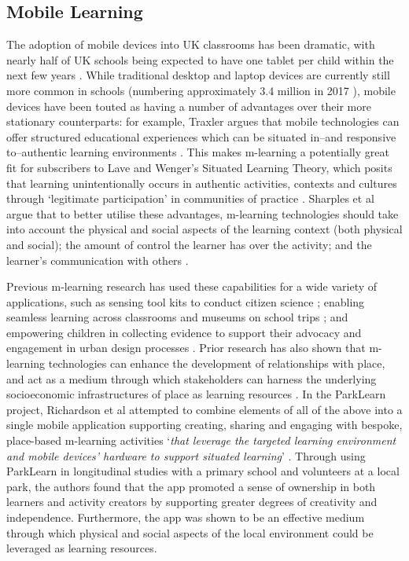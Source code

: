 \documentclass[,hyphens]{sigchi}
\begin{document}
\subsection{Mobile Learning}
The adoption of mobile devices into UK classrooms has been dramatic, with nearly half of UK schools being expected to have one tablet per child within the next few years \cite{BritishEducationalSuppliersAssociation2015}. While traditional desktop and laptop devices are currently still more common in schools (numbering approximately 3.4 million in 2017 \cite{BritishEducationalSuppliersAssociation2017}), mobile devices have been touted as having a number of advantages over their more stationary counterparts: for example, Traxler argues that mobile technologies can offer structured educational experiences which can be situated in--and responsive to--authentic learning environments \cite{Traxler2011}. This makes m-learning a potentially great fit for subscribers to Lave and Wenger's Situated Learning Theory, which posits that learning unintentionally occurs in authentic activities, contexts and cultures through `legitimate participation' in communities of practice \cite{Lave1991}. Sharples et al argue that to better utilise these advantages, m-learning technologies should take into account the physical and social aspects of the learning context (both physical and social); the amount of control the learner has over the activity; and the learner's communication with others \cite{Sharples2007}.

Previous m-learning research has used these capabilities for a wide variety of applications, such as sensing tool kits to conduct citizen science \cite{Sharples2017}; enabling seamless learning across classrooms and museums on school trips \cite{Vavoula2009}; and empowering children in collecting evidence to support their advocacy and engagement in urban design processes \cite{Peacock2018}. Prior research has also shown that m-learning technologies can enhance the development of relationships with place, and act as a medium through which stakeholders can harness the underlying socioeconomic infrastructures of place as learning resources \cite{Richardson2017}. In the ParkLearn project, Richardson et al attempted to combine elements of all of the above into a single mobile application supporting creating, sharing and engaging with bespoke, place-based m-learning activities `\textit{that leverage the targeted learning environment and mobile devices' hardware to support situated learning}' \cite{Richardson2018}. Through using ParkLearn in longitudinal studies with a primary school and volunteers at a local park, the authors found that the app promoted a sense of ownership in both learners and activity creators by supporting greater degrees of creativity and independence. Furthermore, the app was shown to be an effective medium through which physical and social aspects of the local environment could be leveraged as learning resources.
\end{document}
